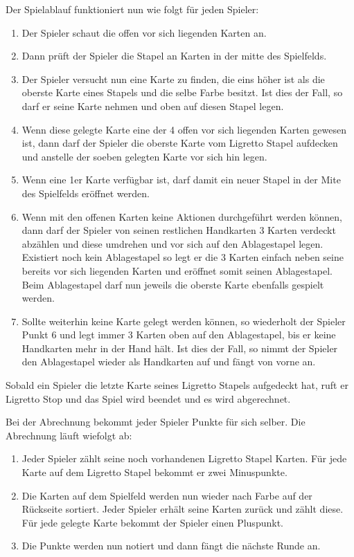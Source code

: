 Der Spielablauf funktioniert nun wie folgt für jeden Spieler:
\begin{enumerate}
\item Der Spieler schaut die offen vor sich liegenden Karten an.
\item Dann prüft der Spieler die Stapel an Karten in der mitte des Spielfelds. 
\item Der Spieler versucht nun eine Karte zu finden, die eins höher ist als die oberste Karte eines Stapels und die selbe Farbe besitzt. Ist dies der Fall, so darf er seine Karte nehmen und oben auf diesen Stapel legen.
\item Wenn diese gelegte Karte eine der 4 offen vor sich liegenden Karten gewesen ist, dann darf der Spieler die oberste Karte vom Ligretto Stapel aufdecken und anstelle der soeben gelegten Karte vor sich hin legen.
\item Wenn eine 1er Karte verfügbar ist, darf damit ein neuer Stapel in der Mite des Spielfelds eröffnet werden.
\item Wenn mit den offenen Karten keine Aktionen durchgeführt werden können, dann darf der Spieler von seinen restlichen Handkarten 3 Karten verdeckt abzählen und diese umdrehen und vor sich auf den Ablagestapel legen. Existiert noch kein Ablagestapel so legt er die 3 Karten einfach neben seine bereits vor sich liegenden Karten und eröffnet somit seinen Ablagestapel. Beim Ablagestapel darf nun jeweils die oberste Karte ebenfalls gespielt werden.
\item Sollte weiterhin keine Karte gelegt werden können, so wiederholt der Spieler Punkt 6 und legt immer 3 Karten oben auf den Ablagestapel, bis er keine Handkarten mehr in der Hand hält. Ist dies der Fall, so nimmt der Spieler den Ablagestapel wieder als Handkarten auf und fängt von vorne an.
\end{enumerate}

Sobald ein Spieler die letzte Karte seines Ligretto Stapels aufgedeckt hat, ruft er Ligretto Stop und das Spiel wird beendet und es wird abgerechnet.

Bei der Abrechnung bekommt jeder Spieler Punkte für sich selber. Die Abrechnung läuft wiefolgt ab:


\begin{enumerate}
\item Jeder Spieler zählt seine noch vorhandenen Ligretto Stapel Karten. Für jede Karte auf dem Ligretto Stapel bekommt er zwei Minuspunkte.
\item Die Karten auf dem Spielfeld werden nun wieder nach Farbe auf der Rückseite sortiert. Jeder Spieler erhält seine Karten zurück und zählt diese. Für jede gelegte Karte bekommt der Spieler einen Pluspunkt.
\item Die Punkte werden nun notiert und dann fängt die nächste Runde an.
\end{enumerate}